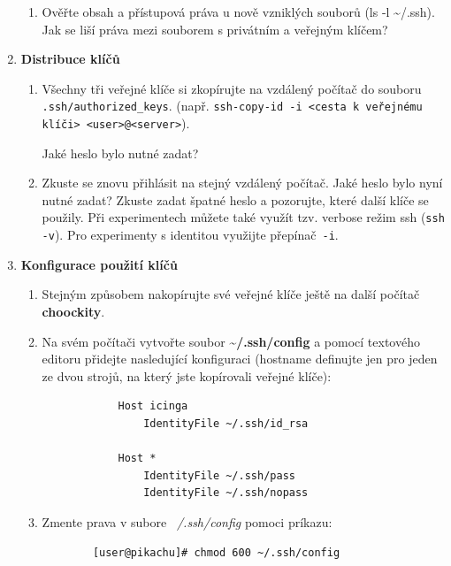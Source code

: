 \begin{enumerate}
\begin{enumerate}
      \item Ověřte obsah a přístupová práva u nově vzniklých souborů (ls -l \textasciitilde/.ssh). Jak
se liší práva mezi souborem s privátním a veřejným klíčem?

    \end{enumerate}

  \item {\bf Distribuce klíčů}

    \begin{enumerate}

      \item Všechny tři veřejné klíče si zkopírujte na vzdálený počítač do
        souboru \verb|.ssh/authorized_keys|.
        (např. {\verb&ssh-copy-id -i <cesta k veřejnému klíči> <user>@<server>&}).
        
      Jaké heslo bylo nutné zadat?

      \item Zkuste se znovu přihlásit na stejný vzdálený počítač. Jaké heslo bylo nyní nutné zadat? Zkuste
zadat špatné heslo a pozorujte, které další klíče se použily. Při experimentech můžete také
využít tzv. verbose režim ssh ({\tt ssh -v}). Pro experimenty s identitou
využijte přepínač~{\tt -i}.

    \end{enumerate}

  \item {\bf Konfigurace použití klíčů}

    \begin{enumerate}

      \item Stejným způsobem nakopírujte své veřejné klíče ještě na další počítač \textbf{choockity}.

      \item Na svém počítači vytvořte soubor \textbf{\textasciitilde/.ssh/config} a pomocí textového editoru přidejte
        nasledující konfiguraci (hostname definujte jen pro jeden ze dvou strojů, na který jste
        kopírovali veřejné klíče):
        \begin{verbatim}
            Host icinga
                IdentityFile ~/.ssh/id_rsa

            Host *
                IdentityFile ~/.ssh/pass
                IdentityFile ~/.ssh/nopass
        \end{verbatim}
    \item Zmente prava v subore \textit{~/.ssh/config} pomoci príkazu:
      \begin{lstlisting}
        [user@pikachu]# chmod 600 ~/.ssh/config
      \end{lstlisting}
    

\end{enumerate}
\end{enumerate}
